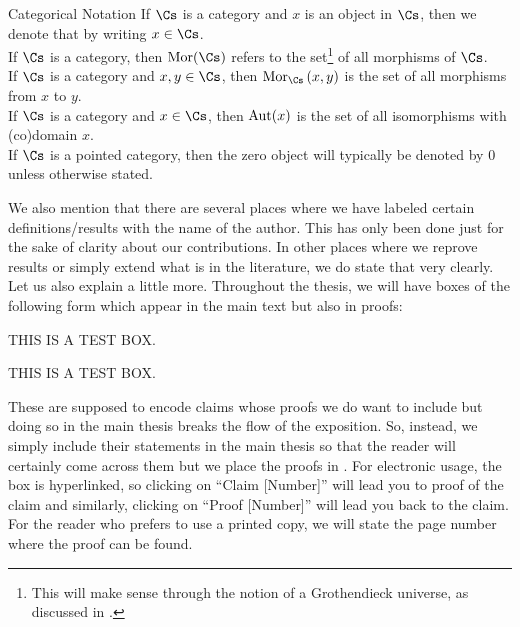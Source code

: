 \documentclass[preamble.tex]{subfiles}
\begin{document}
\begin{filingbox}{\large Categorical Notation}{}
If $\Cs$ is a category and $x$ is an object in $\Cs$, then we denote that by writing $x \in \Cs$.\\If $\Cs$ is a category, then $\Morphisms(\Cs)$ refers to the set\footnote{This will make sense through the notion of a Grothendieck universe, as discussed in .} of all morphisms of $\Cs$.\\ 
If $\Cs$ is a category and $x,y \in \Cs$, then $\Mor{\Cs}{x}{y}$ is the set of all morphisms from $x$ to $y$.\\ 
If $\Cs$ is a category and $x \in \Cs$, then $\operatorname{Aut}(x)$ is the set of all isomorphisms with (co)domain $x$.\\ 
If $\Cs$ is a pointed category, then the zero object will typically be denoted by $0$ unless otherwise stated.
\end{filingbox}

We also mention that there are several places where we have labeled certain definitions/results with the name of the author. This has only been done just for the sake of clarity about our contributions. In other places where we reprove results or simply extend what is in the literature, we do state that very clearly. Let us also explain  a little more. Throughout the thesis, we will have boxes of the following form which appear in the main text but also in proofs:
\begin{exercise}
THIS IS A TEST BOX.
\end{exercise}
\begin{solution}
THIS IS A TEST BOX.
\end{solution}

These are supposed to encode claims whose proofs we do want to include but doing so in the main thesis breaks the flow of the exposition. So, instead, we simply include their statements in the main thesis so that the reader will certainly come across them but we place the proofs in . For electronic usage, the box is hyperlinked, so clicking on ``Claim [Number]'' will lead you to proof of the claim and similarly, clicking on ``Proof [Number]'' will lead you back to the claim. For the reader who prefers to use a printed copy, we will state the page number where the proof can be found.






\end{document}
